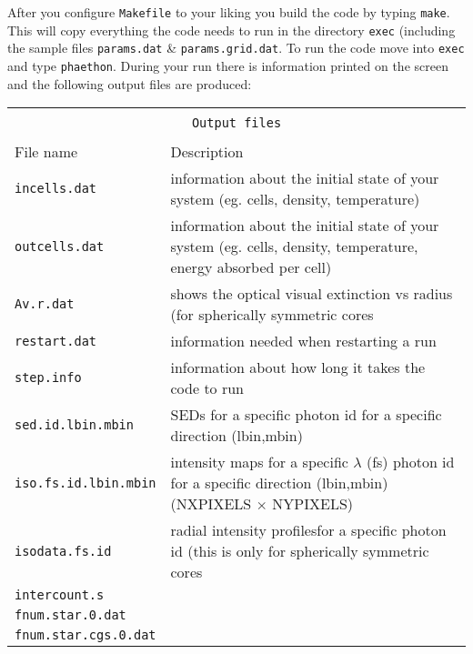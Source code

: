 \documentclass[12pt,a4paper]{article}
\begin{document}
After you configure \texttt{Makefile} to your liking you  build the code by typing
{\texttt{make}}. This will copy everything the code needs to run in the directory {\texttt{exec}} (including the sample files \texttt{params.dat} \& \texttt{params.grid.dat}. To run the code move into {\texttt{exec}} and type \texttt{phaethon}. During your run there is information printed on the screen and the following output files are produced:

\vspace{2cm}
{\centering 
\begin{tabular}{|p{4cm}|p{13.1cm}|}
\hline
\multicolumn{2}{|c|}{}\\ 
\multicolumn{2}{|c|}{\large\texttt{Output files}}\\
\multicolumn{2}{|c|}{}\\  
\hline
File name & Description \\
\hline
\texttt{incells.dat} &  information about the initial state of your system (eg. cells, density, temperature)\\
\texttt{outcells.dat} &   information about the initial state of your system (eg. cells, density, temperature, energy absorbed per cell)\\
\texttt{Av.r.dat} & shows the optical visual extinction vs radius (for spherically symmetric cores\\
\texttt{restart.dat} & information needed when restarting a run \\
\texttt{step.info} & information about how long it takes the code to run\\
\texttt{sed.id.lbin.mbin} & SEDs for a specific photon id for a specific direction (lbin,mbin)\\
\texttt{iso.fs.id.lbin.mbin} & intensity maps for a specific $\lambda$ (fs) photon id for a specific direction (lbin,mbin) (NXPIXELS $\times$ NYPIXELS) \\
\texttt{isodata.fs.id} & radial intensity profilesfor a specific photon id  (this is only for spherically symmetric cores \\
\texttt{intercount.s} & \\

\texttt{fnum.star.0.dat} & \\
\texttt{fnum.star.cgs.0.dat} & \\
\hline
\end{tabular}
\par}
\end{document}
